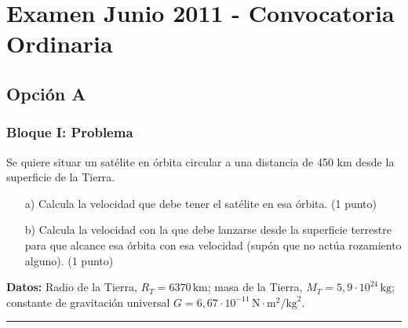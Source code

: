 
\chapter{Examen Junio 2011 - Convocatoria Ordinaria}
\label{chap:2011_jun_ord}

\section{Opción A}
\label{sec:A_2011_jun_ord}

\subsection{Bloque I: Problema}
\label{subsec:A1_2011_jun_ord}

\begin{cajaenunciado}
Se quiere situar un satélite en órbita circular a una distancia de 450 km desde la superficie de la Tierra.
\begin{enumerate}
    \item[a)] Calcula la velocidad que debe tener el satélite en esa órbita. (1 punto)
    \item[b)] Calcula la velocidad con la que debe lanzarse desde la superficie terrestre para que alcance esa órbita con esa velocidad (supón que no actúa rozamiento alguno). (1 punto)
\end{enumerate}
\textbf{Datos:} Radio de la Tierra, $R_{T}=6370\,\text{km}$; masa de la Tierra, $M_{T}=5,9\cdot10^{24}\,\text{kg}$; constante de gravitación universal $G=6,67\cdot10^{-11}\,\text{N}\cdot\text{m}^2/\text{kg}^2$.
\end{cajaenunciado}
\hrule

